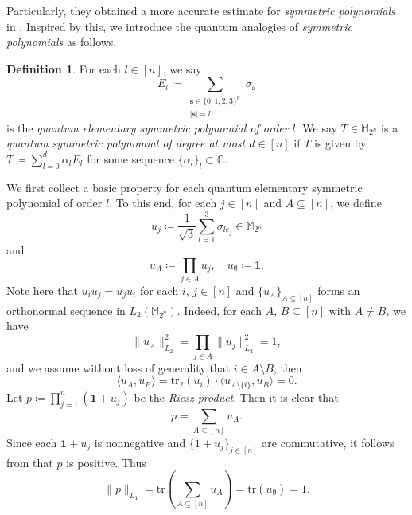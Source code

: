 \documentclass{amsbook}
\theoremstyle{definition}
\newtheorem{definition}[theorem]{Definition}
\theoremstyle{remark}
\numberwithin{section}{chapter}
\numberwithin{equation}{chapter}
\newcommand{\M}{\mathbb{M}}
\newcommand{\1}{\mathbf{1}}
\newcommand{\s}{\mathbf{s}}
\begin{document}
Particularly, they obtained a more accurate estimate for \emph{symmetric polynomials} in \cite[Theorem 4]{EZ2024}. 
Inspired by this,  we introduce the quantum analogies of \emph{symmetric polynomials} as follows.
\begin{definition}
 For each $l\in [n]$, we say
\[
E_{l}\coloneqq \sum_{\substack{\s\in \{0,1,2,3\}^{n}\\|\s|=l}}\sigma_{\s}
\]
is  the \emph{quantum elementary symmetric polynomial of order $l$}. We say $T\in \M_{2^n}$ is a \emph{quantum symmetric polynomial of degree at most $d\in [n]$}  if $T$ is  given by $T\coloneqq\sum_{l=0}^{d}\alpha_{l}E_{l}$ for some sequence $\{\alpha_{l}\}_l\subset \mathbb{C}$.
\end{definition}

We first collect a  basic property for each quantum elementary symmetric polynomial of order $l$. To this end,  for each $j\in [n]$ and $A\subseteq [n]$, we define
\begin{equation}\label{transference element}
u_{j}\coloneqq \frac{1}{\sqrt{3}}\sum_{l=1}^{3}\sigma_{le_{j}}\in \M_{2^n}
\end{equation}
and
\begin{equation}\label{transference Walsh}
u_{A}\coloneqq \prod_{j\in A}u_{j},\quad u_{\emptyset}\coloneqq \mathbf{1}.
\end{equation}
Note here that $u_{i}u_{j}=u_{j}u_{i}$ for each $i$, $j\in [n]$ and $\{u_{A}\}_{A\subseteq [n]}$ forms an orthonormal sequence in $L_{2}(\M_{2^n})$. Indeed, for each $A$, $B\subseteq [n]$ with $A\neq B$, we have
\begin{equation}\label{normal}
\|u_{A}\|^{2}_{L_{2}}=\prod_{j\in A}\|u_{j}\|^{2}_{L_{2}}=1,
\end{equation}
and we assume without loss of generality that $i\in A\setminus B$, then 
\begin{equation}\label{orthogonal}
\langle u_{A},u_{B}\rangle=\mathrm{tr}_{2}(u_{i})\cdot\langle u_{A\setminus \{i\}},u_{B}\rangle=0.
\end{equation}
Let $p\coloneqq \prod_{j=1}^{n}(\mathbf{1}+u_{j})$ be the \emph{Riesz product}. Then it is clear that \begin{equation}\label{p uA}
p=\sum_{A\subseteq [n]}u_{A}. 
\end{equation} 
Since each $\mathbf{1}+u_{j}$ is nonnegative and $\{1+u_j\}_{j\in [n]}$ are commutative, it follows from that $p$ is positive. Thus
\begin{equation}\label{p L1}
\|p\|_{L_{1}}=\mathrm{tr}\left(\sum_{A\subseteq [n]}u_{A}\right)=\mathrm{tr}(u_{\emptyset})=1.
\end{equation}
\end{document}
